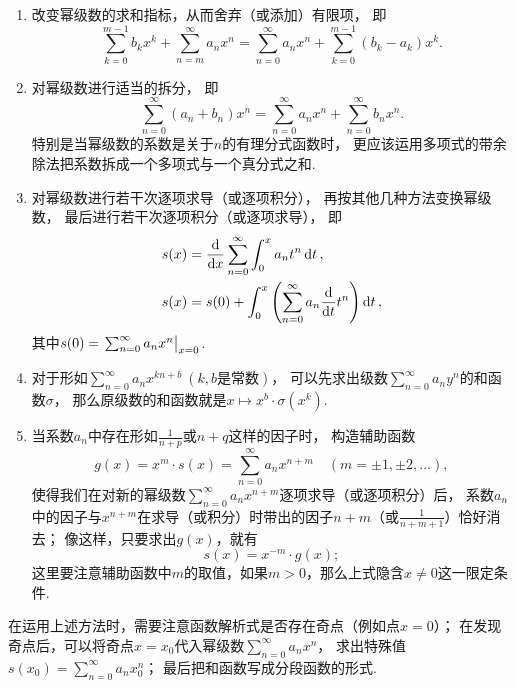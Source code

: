 \begin{enumerate}
\begin{enumerate}
		\item 改变幂级数的求和指标，从而舍弃（或添加）有限项，
		即\begin{equation*}
			\sum_{k=0}^{m-1} b_k x^k + \sum_{n=m}^\infty a_n x^n
			= \sum_{n=0}^\infty a_n x^n + \sum_{k=0}^{m-1} (b_k-a_k) x^k.
		\end{equation*}

		\item 对幂级数进行适当的拆分，
		即\begin{equation*}
			\sum_{n=0}^\infty (a_n + b_n) x^n
			= \sum_{n=0}^\infty a_n x^n
			+ \sum_{n=0}^\infty b_n x^n.
		\end{equation*}
		特别是当幂级数的系数是关于\(n\)的有理分式函数时，
		更应该运用多项式的带余除法把系数拆成一个多项式与一个真分式之和.

		\item 对幂级数进行若干次逐项求导（或逐项积分），
		再按其他几种方法变换幂级数，
		最后进行若干次逐项积分（或逐项求导），
		即\begin{align*}
			s(x) &= \dv{x} \sum_{n=0}^\infty \int_0^x a_n t^n \dd{t}, \\
			s(x) &= s(0) + \int_0^x \left(\sum_{n=0}^\infty a_n \dv{t} t^n\right) \dd{t},
		\end{align*}
		其中\(s(0) = \eval{\sum_{n=0}^\infty a_n x^n}_{x=0}\).

		\item 对于形如\(\sum_{n=0}^\infty a_n x^{kn+b}\ (\text{$k,b$是常数})\)，
		可以先求出级数\(\sum_{n=0}^\infty a_n y^n\)的和函数\(\sigma\)，
		那么原级数的和函数就是\(x \mapsto x^b \cdot \sigma(x^k)\).

		\item 当系数\(a_n\)中存在形如\(\frac{1}{n+p}\)或\(n+q\)这样的因子时，
		构造辅助函数\begin{equation*}
			g(x) = x^m \cdot s(x) = \sum_{n=0}^\infty a_n x^{n+m}
			\quad(m=\pm1,\pm2,\dotsc),
		\end{equation*}
		使得我们在对新的幂级数\(\sum_{n=0}^\infty a_n x^{n+m}\)逐项求导（或逐项积分）后，
		系数\(a_n\)中的因子与\(x^{n+m}\)在求导（或积分）时带出的因子\(n+m\)（或\(\frac{1}{n+m+1}\)）恰好消去；
		像这样，只要求出\(g(x)\)，就有\begin{equation*}
			s(x) = x^{-m} \cdot g(x);
		\end{equation*}
		这里要注意辅助函数中\(m\)的取值，如果\(m>0\)，那么上式隐含\(x\neq0\)这一限定条件.
	\end{enumerate}
	在运用上述方法时，需要注意函数解析式是否存在奇点（例如点\(x=0\)）；
	在发现奇点后，可以将奇点\(x=x_0\)代入幂级数\(\sum_{n=0}^\infty a_n x^n\)，
	求出特殊值\(s(x_0) = \sum_{n=0}^\infty a_n x_0^n\)；
	最后把和函数写成分段函数的形式.
\end{enumerate}

